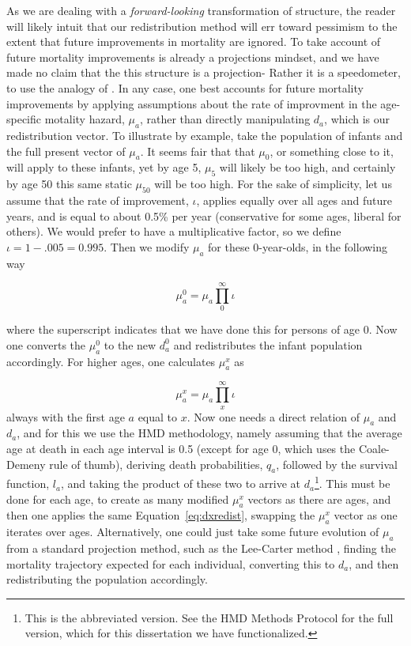 \FloatBarrier
\label{sec:eximprov}
As we are dealing with a \textit{forward-looking}\citep{sanderson2007new}
transformation of structure, the reader will likely intuit that our redistribution 
method will err toward pessimism to the extent that
future improvements in mortality are ignored. To take account of future
mortality improvements is already a projections mindset, and we have made no
claim that the this structure is a projection- Rather it is a speedometer, to
use the analogy of \citet{coale1972growth}. In any case, one best accounts for
future mortality improvements by applying assumptions about the rate of
improvment in the age-specific motality hazard, $\mu_a$, rather than directly
manipulating $d_a$, which is our redistribution vector. To illustrate by
example, take the population of infants and the full present vector of $\mu_a$. It seems fair that
that $\mu_0$, or something close to it, will apply to these infants, yet by age
5, $\mu_5$ will likely be too high, and certainly by age 50
this same static $\mu_50$ will be too high. For the sake of simplicity, let us assume that the
rate of improvement, $\iota$, applies equally over all ages and future years,
and is equal to about 0.5\% per year (conservative for some ages, liberal
for others). We would prefer to have a multiplicative factor, so we define
$\iota = 1-.005 = 0.995$. Then we modify $\mu_a$ for these 0-year-olds, in
the following way

\begin{equation}
\mu_a^0 = \mu_a \prod _0 ^\infty \iota 
\end{equation}

where the superscript indicates that we have done this for persons of age 0. Now
one converts the $\mu _a^0$ to the new $d_a^0$ and redistributes the infant
population accordingly. For higher ages, one calculates $\mu_a^x$ as

\begin{equation}
\mu_a^x = \mu_a \prod _x ^\infty \iota 
\end{equation}
always with the first age $a$ equal to $x$.
Now one needs a direct relation of $\mu _a$ and $d_a$, and for this we use the
HMD methodology, namely assuming that the average age at death in each age
interval is 0.5 (except for age 0, which uses the Coale-Demeny rule of thumb),
deriving death probabilities, $q_a$, followed by the survival function, $l_a$,
and taking the product of these two to arrive at $d_a$\footnote{This is the
abbreviated version. See the HMD Methods Protocol for the full version, which
for this dissertation we have functionalized.}. This must be done for each age,
to create as many modified $\mu _a^x $ vectors as there are ages, and then one applies the same
Equation~\ref{eq:dxredist}, swapping the $\mu _a^x$ vector as one iterates over
ages. Alternatively, one could just take some future evolution of $\mu_a$ from a
standard projection method, such as the Lee-Carter method
\citep{lee1992modeling}, finding the mortality trajectory expected for each individual, converting
this to $d_a$, and then redistributing the population accordingly. 

